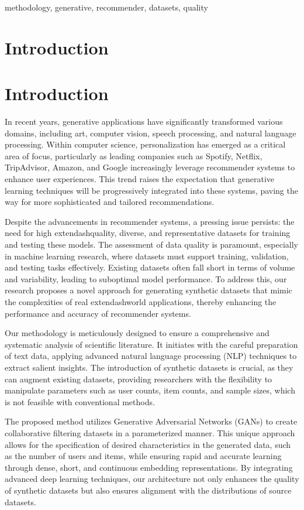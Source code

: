 \documentclass[runningheads]{llncs}
\begin{document}
\begin{keywords}
methodology, generative, recommender, datasets, quality
\end{keywords}

\section{Introduction}
\section*{Introduction}

In recent years, generative applications have significantly transformed various domains, including art, computer vision, speech processing, and natural language processing. Within computer science, personalization has emerged as a critical area of focus, particularly as leading companies such as Spotify, Netflix, TripAdvisor, Amazon, and Google increasingly leverage recommender systems to enhance user experiences. This trend raises the expectation that generative learning techniques will be progressively integrated into these systems, paving the way for more sophisticated and tailored recommendations.

Despite the advancements in recommender systems, a pressing issue persists: the need for high	extendash{}quality, diverse, and representative datasets for training and testing these models. The assessment of data quality is paramount, especially in machine learning research, where datasets must support training, validation, and testing tasks effectively. Existing datasets often fall short in terms of volume and variability, leading to suboptimal model performance. To address this, our research proposes a novel approach for generating synthetic datasets that mimic the complexities of real	extendash{}world applications, thereby enhancing the performance and accuracy of recommender systems.

Our methodology is meticulously designed to ensure a comprehensive and systematic analysis of scientific literature. It initiates with the careful preparation of text data, applying advanced natural language processing (NLP) techniques to extract salient insights. The introduction of synthetic datasets is crucial, as they can augment existing datasets, providing researchers with the flexibility to manipulate parameters such as user counts, item counts, and sample sizes, which is not feasible with conventional methods.

The proposed method utilizes Generative Adversarial Networks (GANs) to create collaborative filtering datasets in a parameterized manner. This unique approach allows for the specification of desired characteristics in the generated data, such as the number of users and items, while ensuring rapid and accurate learning through dense, short, and continuous embedding representations. By integrating advanced deep learning techniques, our architecture not only enhances the quality of synthetic datasets but also ensures alignment with the distributions of source datasets.
\end{document}
